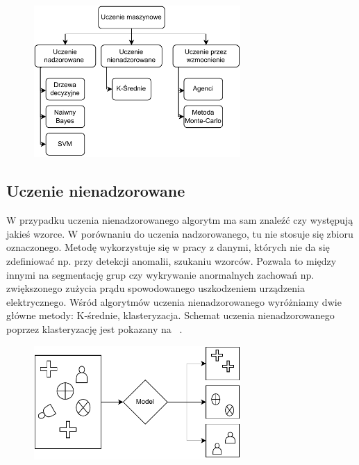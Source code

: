 \begin{figure}[H]
    \centering
    \includegraphics[width=0.7\textwidth]{images/ml-przyklady}
    \label{fig:ml-schema}
\end{figure}

\subsection{Uczenie nienadzorowane}
W przypadku uczenia nienadzorowanego algorytm ma sam znaleźć czy występują jakieś wzorce. W porównaniu do uczenia nadzorowanego, tu nie stosuje się zbioru oznaczonego. Metodę wykorzystuje się w pracy z danymi, których nie da się zdefiniować np. przy detekcji anomalii, szukaniu wzorców. Pozwala to między innymi na segmentację grup czy wykrywanie anormalnych zachowań np. zwiększonego zużycia prądu spowodowanego uszkodzeniem urządzenia elektrycznego. Wśród algorytmów uczenia nienadzorowanego wyróżniamy dwie główne metody: K-średnie, klasteryzacja. Schemat uczenia nienadzorowanego poprzez klasteryzację jest pokazany na ~\cite{AiScience, Mahesh2018}.

\begin{figure}[H]
    \centering
    \includegraphics[width=0.7\textwidth]{images/unsupervised}
    \label{fig:unspervised}
\end{figure}


